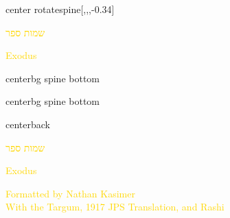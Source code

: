 \documentclass[
coverheight=9.93in,%
coverwidth=7.565in,%
spinewidth=0.875in,
bleedwidth=.75in,
marklength=0in,
12pt,
pagecolor=darkblue,
]{bookcover}
\newcommand{\hebtext}[1]{
\begin{hebrew}
	#1
\end{hebrew}
}
\begin{document}
	\begin{bookcover}
	\begin{bookcoverelement}{center rotate}{spine}[,,,-0.34\coverheight]
		\LARGE\textcolor{gold}{\hebtext{שמות ספר} \space Exodus }
	\end{bookcoverelement}
	\begin{bookcoverelement}{center}{bg spine bottom}
		\raisebox{\bleedwidth+2\baselineskip}{\textcolor{gold}{Kasimer}}
	\end{bookcoverelement}
	\begin{bookcoverelement}{center}{bg spine bottom}
		\raisebox{\bleedwidth}{\textcolor{gold}{Edition}}
	\end{bookcoverelement}

	\begin{bookcoverelement}{center}{back}
		\begin{Huge}
			\textcolor{gold}{\hebtext{שמות ספר}}
			
			\textcolor{gold}{Exodus}
				
		\end{Huge}
		\vspace{2\baselineskip}
		\begin{large}
			\textcolor{gold}{Formatted by Nathan Kasimer\\With the Targum, 1917 JPS Translation, and Rashi}
		\end{large}
	\end{bookcoverelement}
	\end{bookcover}
	
\end{document}

